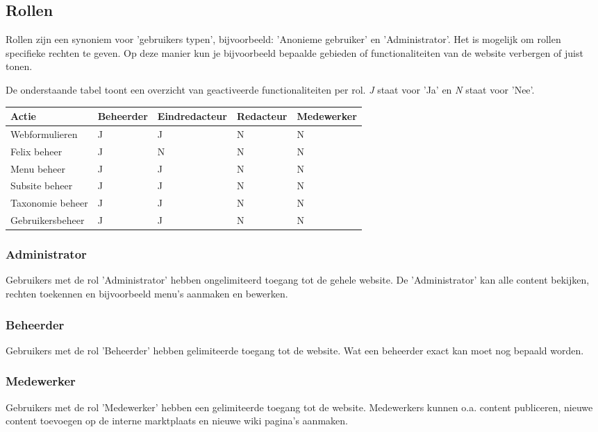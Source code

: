 \subsection{Rollen}\label{rollen}

Rollen zijn een synoniem voor 'gebruikers typen', bijvoorbeeld: 'Anonieme gebruiker' en 'Administrator'.  Het is mogelijk om rollen specifieke rechten te geven. Op deze manier kun je bijvoorbeeld bepaalde gebieden of functionaliteiten van de website verbergen of juist tonen. 

De onderstaande tabel toont een overzicht van geactiveerde functionaliteiten per rol.
\emph{J} staat voor 'Ja' en \emph{N} staat voor 'Nee'. 

\begin{tabularx}{\textwidth}{ | p{5cm} |X|X|X|X| }
  \hline
  Actie & Beheerder & Eindredacteur & Redacteur & Medewerker \\ \hline
  Webformulieren  & J  & J  & N & N  \\ \hline
  Felix beheer  & J  & N  & N & N  \\ \hline
  Menu beheer  & J  & J  & N & N  \\ \hline
  Subsite beheer  & J  & J  & N & N  \\ \hline
  Taxonomie beheer  & J  & J  & N & N  \\ \hline
  Gebruikersbeheer  & J  & J  & N & N  \\ \hline
\end{tabularx}

\subsubsection{Administrator}\label{administrator}
Gebruikers met de rol 'Administrator' hebben ongelimiteerd toegang tot de gehele website. De 'Administrator' kan alle content bekijken, rechten toekennen en bijvoorbeeld menu's aanmaken en bewerken.

\subsubsection{Beheerder}\label{beheerder}
Gebruikers met de rol 'Beheerder' hebben gelimiteerde toegang tot de website. Wat een beheerder exact kan moet nog bepaald worden.

\subsubsection{Medewerker}\label{medewerker}
Gebruikers met de rol 'Medewerker' hebben een gelimiteerde toegang tot de website. Medewerkers kunnen o.a. content publiceren, nieuwe content toevoegen op de interne marktplaats en nieuwe wiki pagina's aanmaken.

